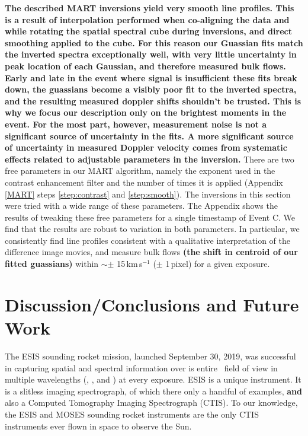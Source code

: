 \documentclass[linenumbers,trackchanges]{aastex63}
\begin{document}
	    \textbf{The described MART inversions yield very smooth line profiles.
	    This is a result of interpolation performed when co-aligning the data and while rotating the spatial spectral cube during inversions, and direct smoothing applied to the cube.
	    For this reason our Guassian fits match the inverted spectra exceptionally well, with very little uncertainty in peak location of each Gaussian, and therefore measured bulk flows.
	    Early and late in the event where signal is insufficient these fits break down, the guassians become a visibly poor fit to the inverted spectra, and the resulting measured doppler shifts shouldn't be trusted.
	    This is why we focus our description only on the brightest moments in the event. For the most part, however, measurement noise is not a significant source of  uncertainty in the fits.
	    A more significant source of uncertainty in measured Doppler velocity comes from systematic effects related to adjustable parameters in the inversion.}		   	
        There are two free parameters in our MART algorithm, namely the exponent used in the contrast enhancement filter and the number of times it is applied (Appendix \ref{MART} steps \ref{step:contrast} and \ref{step:smooth}). The inversions in this section were tried with a wide range of these parameters. 
        The Appendix shows the results of tweaking these free parameters for a single timestamp of Event C.
        We find that the results are robust to variation in both parameters. 
        In particular, we consistently find line profiles consistent with a qualitative interpretation of the difference image movies, and measure bulk flows \textbf{(the shift in centroid of our fitted guassians)} within $\sim\pm$ 15\,km\,s$^{-1}$ ($\pm$ 1\,pixel) for a given exposure. 
    
    	
\section{Discussion/Conclusions and Future Work}
	The ESIS sounding rocket mission, launched September 30, 2019, was successful in capturing spatial and spectral information over is entire \esisfov \ field of view in multiple wavelengths (\hei, \mgxbright, and \ov) at every exposure.
	ESIS is a unique instrument.  
	It is a slitless imaging spectrograph, of which there only a handful of examples, \textbf{and} also a Computed Tomography Imaging Spectrograph (CTIS).  
	To our knowledge, the ESIS and MOSES sounding rocket instruments are the only CTIS instruments ever flown in space to observe the Sun. 
	
\end{document}
